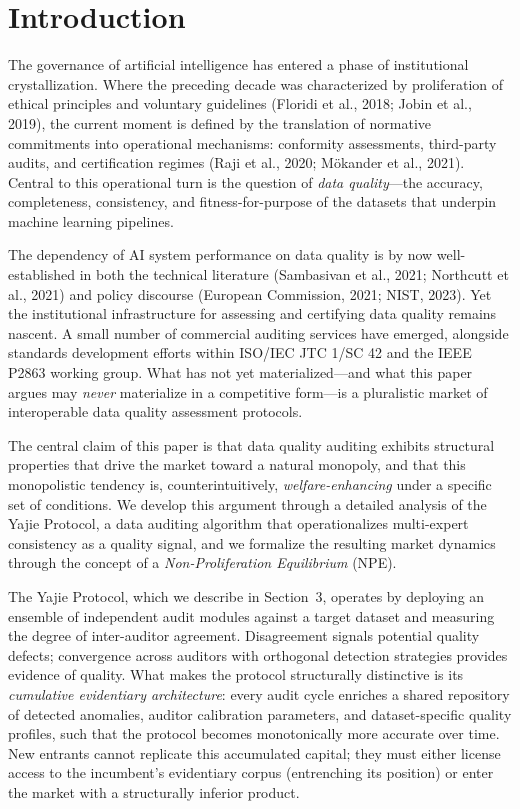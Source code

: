 \documentclass[12pt,a4paper]{article}
\theoremstyle{definition}
\theoremstyle{remark}
\begin{document}
\section{Introduction}

The governance of artificial intelligence has entered a phase of institutional crystallization. Where the preceding decade was characterized by proliferation of ethical principles and voluntary guidelines (Floridi et al., 2018; Jobin et al., 2019), the current moment is defined by the translation of normative commitments into operational mechanisms: conformity assessments, third-party audits, and certification regimes (Raji et al., 2020; M\"{o}kander et al., 2021). Central to this operational turn is the question of \textit{data quality}—the accuracy, completeness, consistency, and fitness-for-purpose of the datasets that underpin machine learning pipelines.

The dependency of AI system performance on data quality is by now well-established in both the technical literature (Sambasivan et al., 2021; Northcutt et al., 2021) and policy discourse (European Commission, 2021; NIST, 2023). Yet the institutional infrastructure for assessing and certifying data quality remains nascent. A small number of commercial auditing services have emerged, alongside standards development efforts within ISO/IEC JTC 1/SC 42 and the IEEE P2863 working group. What has not yet materialized—and what this paper argues may \textit{never} materialize in a competitive form—is a pluralistic market of interoperable data quality assessment protocols.

The central claim of this paper is that data quality auditing exhibits structural properties that drive the market toward a natural monopoly, and that this monopolistic tendency is, counterintuitively, \textit{welfare-enhancing} under a specific set of conditions. We develop this argument through a detailed analysis of the Yajie Protocol, a data auditing algorithm that operationalizes multi-expert consistency as a quality signal, and we formalize the resulting market dynamics through the concept of a \textit{Non-Proliferation Equilibrium} (NPE).

The Yajie Protocol, which we describe in Section~3, operates by deploying an ensemble of independent audit modules against a target dataset and measuring the degree of inter-auditor agreement. Disagreement signals potential quality defects; convergence across auditors with orthogonal detection strategies provides evidence of quality. What makes the protocol structurally distinctive is its \textit{cumulative evidentiary architecture}: every audit cycle enriches a shared repository of detected anomalies, auditor calibration parameters, and dataset-specific quality profiles, such that the protocol becomes monotonically more accurate over time. New entrants cannot replicate this accumulated capital; they must either license access to the incumbent's evidentiary corpus (entrenching its position) or enter the market with a structurally inferior product.
\end{document}
